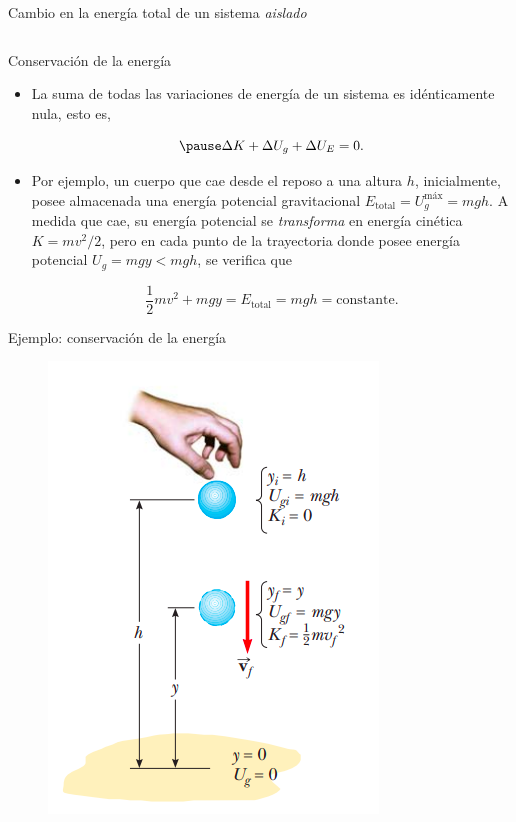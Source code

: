 \begin{frame}{Cambio en la energía total de un sistema \textit{aislado}}
\begin{columns}
        \end{columns}
        
    \end{frame}
    

    \begin{frame}{Conservación de la energía}
        \begin{itemize}
            \pause \item La suma de todas las variaciones de energía de un sistema es idénticamente nula, esto es,
            
            \begin{equation}
            \pause     \Delta K+\Delta U_g + \Delta U_E=0.
            \end{equation}
            
            \pause \item Por ejemplo, un cuerpo que cae desde el reposo a una altura $h$, inicialmente, posee almacenada una energía potencial gravitacional $E_{\text{total}}=U_g^{\text{máx}}=mgh$. A medida que cae, su energía potencial se \textit{transforma} en energía cinética $K=mv^2/2$, pero en cada punto de la trayectoria donde posee energía potencial $U_g=mgy<mgh$, se verifica que
            
            \pause $$\frac{1}{2}mv^2+mgy=E_{\text{total}}=mgh=\text{constante}.$$
            
        \end{itemize}
    \end{frame}
    

    \begin{frame}{Ejemplo: conservación de la energía}
        \begin{figure}
            \centering
            \includegraphics[scale=0.5]{figures/Ejem.png}
        \end{figure}
    \end{frame}
    
